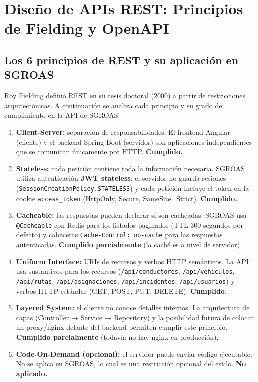 \section{Diseño de APIs REST: Principios de Fielding y OpenAPI}
\subsection{Los 6 principios de REST y su aplicación en SGROAS}

Roy Fielding definió REST en su tesis doctoral (2000) a partir de restricciones arquitectónicas. A continuación se
analiza cada principio y su grado de cumplimiento en la API de SGROAS.

\begin{enumerate}
    \item \textbf{Client-Server:} separación de responsabilidades. El frontend Angular (cliente) y el backend
    Spring Boot (servidor) son aplicaciones independientes que se comunican únicamente por HTTP. \textbf{Cumplido.}
    \item \textbf{Stateless:} cada petición contiene toda la información necesaria. SGROAS utiliza autenticación
    \textbf{JWT stateless}: el servidor no guarda sesiones (\texttt{SessionCreationPolicy.STATELESS}) y cada
    petición incluye el token en la cookie \texttt{access\_token} (HttpOnly, Secure, SameSite=Strict).
    \textbf{Cumplido.}
    \item \textbf{Cacheable:} las respuestas pueden declarar si son cacheadas. SGROAS usa \texttt{@Cacheable} con
    Redis para los listados paginados (TTL 300 segundos por defecto) y cabeceras \texttt{Cache-Control: no-cache}
    para las respuestas autenticadas. \textbf{Cumplido parcialmente} (la caché es a nivel de servidor).
    \item \textbf{Uniform Interface:} URIs de recursos y verbos HTTP semánticos. La API usa sustantivos para los
    recursos (\texttt{/api/conductores}, \texttt{/api/vehiculos}, \texttt{/api/rutas}, \texttt{/api/asignaciones},
    \texttt{/api/incidentes}, \texttt{/api/usuarios}) y verbos HTTP estándar (GET, POST, PUT, DELETE).
    \textbf{Cumplido.}
    \item \textbf{Layered System:} el cliente no conoce detalles internos. La arquitectura de capas (Controller →
    Service → Repository) y la posibilidad futura de colocar un proxy/nginx delante del backend permiten cumplir
    este principio. \textbf{Cumplido parcialmente} (todavía no hay nginx en producción).
    \item \textbf{Code-On-Demand (opcional):} el servidor puede enviar código ejecutable. No se aplica en SGROAS,
    lo cual es una restricción opcional del estilo. \textbf{No aplicado.}
\end{enumerate}

